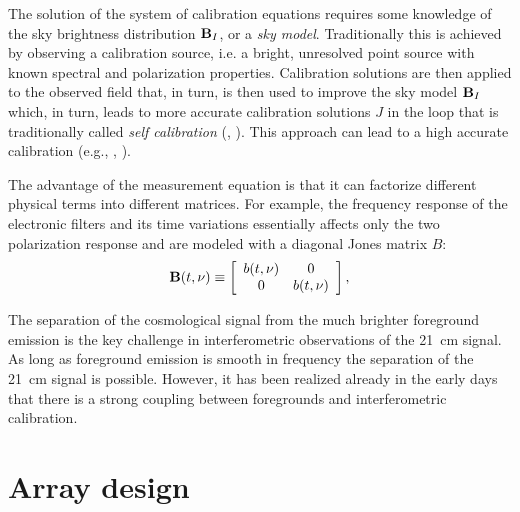 The solution of the system of calibration equations requires some knowledge of the sky brightness distribution ${\bf B}_I$, or a {\it sky model}. Traditionally this is achieved by observing a calibration source, i.e. a bright, unresolved point source with known spectral and polarization properties. Calibration solutions are then applied to the observed field that, in turn, is then used to improve the sky model ${\bf B}_I$ which, in turn, leads to more accurate calibration solutions $J$ in the loop that is traditionally called {\it self calibration} (\cite{wilkinson82}, \cite{pearson84}). This approach can lead to a high accurate calibration (e.g., \cite{bernardi10}, \cite{smirnov11b}).

The advantage of the measurement equation is that it can factorize different physical terms into different matrices. For example, the frequency response of the electronic filters and its time variations essentially affects only the two polarization response and are modeled with a diagonal Jones matrix $B$:
\begin{equation}
    {\bf B} (t,\nu) \equiv 
    \left[
    \begin{array}{cc}
    b (t,\nu) 	& 	0 	\\
    0 		& b (t,\nu) 	\\
    \end{array}
    \right],   
\label{eq:sec:4}
\end{equation} 




The separation of the cosmological signal from the much brighter foreground emission is the key challenge in interferometric observations of the 21~cm signal. As long as foreground emission is smooth in frequency the separation of the 21~cm signal is possible. However, it has been realized already in the early days that there is a strong coupling between foregrounds and interferometric calibration. 


\section{Array design}
\label{sec:design}





